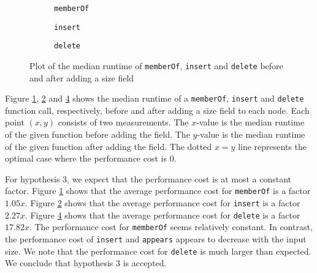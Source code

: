 \documentclass[../main.tex]{subfiles}
\begin{document}
\begin{figure}[H]
    \pgfplotsset{width=\linewidth}
    \centering
    \begin{subfigure}[c]{0.495\textwidth}
    
    \caption{\lstinline{memberOf}}
    \label{memberOf-performance-with-size}
    \end{subfigure}
    \hfill
    \begin{subfigure}[c]{0.495\textwidth}
    
    \caption{\lstinline{insert}}
    \label{insert-performance-with-size}
    \end{subfigure}
    \begin{subfigure}[c]{0.495\textwidth}
    
    \caption{\lstinline{delete}}
    \label{delete-performance-with-size}
    \end{subfigure}
    \caption{Plot of the median \textsf{runtime} of \lstinline{memberOf}, \lstinline{insert} and \lstinline{delete} before and after adding a size field}
\end{figure}

Figure \ref{memberOf-performance-with-size}, \ref{insert-performance-with-size} and \ref{delete-performance-with-size} shows the median runtime of a \lstinline{memberOf}, \lstinline{insert} and \lstinline{delete} function call, respectively, before and after adding a size field to each node. Each point $(x, y)$ consists of two measurements. The $x$-value is the median runtime of the given function before adding the field. The $y$-value is the median runtime of the given function after adding the field. The dotted $x = y$ line represents the optimal case where the performance cost is $0$.

For hypothesis 3, we expect that the performance cost is at most a constant factor. Figure \ref{memberOf-performance-with-size} shows that the average performance cost for \lstinline{memberOf} is a factor $1.05x$. Figure \ref{insert-performance-with-size} shows that the average performance cost for \lstinline{insert} is a factor $2.27x$. Figure \ref{delete-performance-with-size} shows that the average performance cost for \lstinline{delete} is a factor $17.82x$. The performance cost for \lstinline{memberOf} seems relatively constant. In contrast, the performance cost of \lstinline{insert} and \lstinline{appears} appears to decrease with the input size. We note that the performance cost for \lstinline{delete} is much larger than expected. We conclude that hypothesis 3 is accepted.
\end{document}
